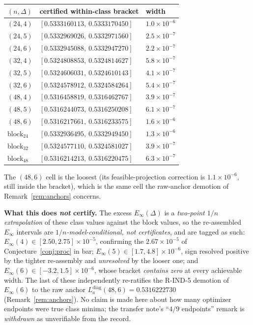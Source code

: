 \documentclass[11pt]{article}
\theoremstyle{definition}
\theoremstyle{remark}
\begin{document}
\begin{center}
\begin{tabular}{lll}
$(n,\Delta)$ & certified within-class bracket & width\\
\hline
$(24,4)$ & $[0.5333160113,\ 0.5333170450]$ & $1.0\times10^{-6}$\\
$(24,5)$ & $[0.5332969026,\ 0.5332971560]$ & $2.5\times10^{-7}$\\
$(24,6)$ & $[0.5332945088,\ 0.5332947270]$ & $2.2\times10^{-7}$\\
$(32,4)$ & $[0.5324808853,\ 0.5324814627]$ & $5.8\times10^{-7}$\\
$(32,5)$ & $[0.5324606031,\ 0.5324610143]$ & $4.1\times10^{-7}$\\
$(32,6)$ & $[0.5324578912,\ 0.5324584264]$ & $5.4\times10^{-7}$\\
$(48,4)$ & $[0.5316458819,\ 0.5316462767]$ & $3.9\times10^{-7}$\\
$(48,5)$ & $[0.5316244073,\ 0.5316250208]$ & $6.1\times10^{-7}$\\
$(48,6)$ & $[0.5316217661,\ 0.5316233575]$ & $1.6\times10^{-6}$\\
$\mathrm{block}_{24}$ & $[0.5332936495,\ 0.5332949450]$
  & $1.3\times10^{-6}$\\
$\mathrm{block}_{32}$ & $[0.5324577110,\ 0.5324581027]$
  & $3.9\times10^{-7}$\\
$\mathrm{block}_{48}$ & $[0.5316214213,\ 0.5316220475]$
  & $6.3\times10^{-7}$\\
\end{tabular}
\end{center}

\noindent The $(48,6)$ cell is the loosest (its feasible-projection
correction is $1.1\times10^{-6}$, still inside the bracket), which is
the same cell the raw-anchor demotion of Remark~\ref{rem:anchors}
concerns.

\medskip\noindent\textbf{What this does \emph{not} certify.} The excess
$E_\infty(\Delta)$ is a \emph{two-point $1/n$ extrapolation} of these
class values against the block values, so the re-assembled
$E_\infty$ intervals are \emph{$1/n$-model-conditional, not
certificates}, and are tagged as such:
$E_\infty(4)\in[2.50,2.75]\times10^{-5}$, confirming the
$2.67\times10^{-5}$ of Conjecture~\ref{conj:proc} in bar;
$E_\infty(5)\in[1.7,4.8]\times10^{-6}$, sign resolved positive by the
tighter re-assembly and \emph{unresolved} by the looser one; and
$E_\infty(6)\in[-3.2,1.5]\times10^{-6}$, whose bracket \emph{contains
zero} at every achievable width. The last of these independently
re-ratifies the R-IND-5 demotion of $E_\infty(6)$ to the raw anchor
$L_a^{\mathrm{diag}}(48,6)=0.5316222730$
(Remark~\ref{rem:anchors}). No claim is made here about how many
optimizer endpoints were true class minima; the transfer note's
``$4/9$ endpoints'' remark is \emph{withdrawn} as unverifiable from the
record.
\end{document}
